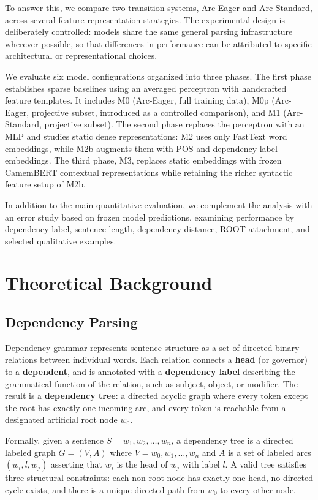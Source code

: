 \documentclass[12pt,letterpaper]{article}
\begin{document}
To answer this, we compare two transition systems, Arc-Eager and Arc-Standard, across several feature representation strategies. The experimental design is deliberately controlled: models share the same general parsing infrastructure wherever possible, so that differences in performance can be attributed to specific architectural or representational choices.

We evaluate six model configurations organized into three phases. The first phase establishes sparse baselines using an averaged perceptron with handcrafted feature templates. It includes M0 (Arc-Eager, full training data), M0p (Arc-Eager, projective subset, introduced as a controlled comparison), and M1 (Arc-Standard, projective subset). The second phase replaces the perceptron with an MLP and studies static dense representations: M2 uses only FastText word embeddings, while M2b augments them with POS and dependency-label embeddings. The third phase, M3, replaces static embeddings with frozen CamemBERT contextual representations while retaining the richer syntactic feature setup of M2b.

In addition to the main quantitative evaluation, we complement the analysis with an error study based on frozen model predictions, examining performance by dependency label, sentence length, dependency distance, ROOT attachment, and selected qualitative examples.


\section{Theoretical Background}
\label{sec:theoretical_background}
\subsection{Dependency Parsing}
\label{subsec:dependency_parsing}

Dependency grammar represents sentence structure as a set of directed binary relations between individual words. Each relation connects a \textbf{head} (or governor) to a \textbf{dependent}, and is annotated with a \textbf{dependency label} describing the grammatical function of the relation, such as subject, object, or modifier. The result is a \textbf{dependency tree}: a directed acyclic graph where every token except the root has exactly one incoming arc, and every token is reachable from a designated artificial root node $w_0$.

Formally, given a sentence $S = w_1, w_2, \ldots, w_n$, a dependency tree is a directed labeled graph $G = (V, A)$ where $V = {w_0, w_1, \ldots, w_n}$ and $A$ is a set of labeled arcs $(w_i, l, w_j)$ asserting that $w_i$ is the head of $w_j$ with label $l$. A valid tree satisfies three structural constraints: each non-root node has exactly one head, no directed cycle exists, and there is a unique directed path from $w_0$ to every other node.
\end{document}
